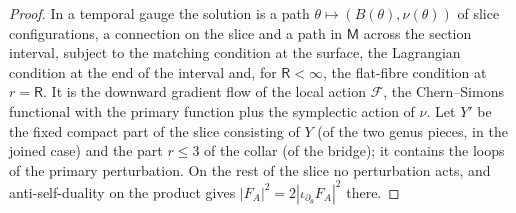 \documentclass[11pt]{amsart}
\theoremstyle{definition}
\theoremstyle{remark}
\theoremstyle{plain}
\numberwithin{equation}{section}
\newcommand{\Msf}{\mathsf{M}}
\begin{document}
\begin{proof}
In a temporal gauge the solution is a path $\theta\mapsto(B(\theta),\nu(\theta))$ of slice
configurations, a connection on the slice and a path in $\Msf$ across the section interval,
subject to the matching condition at the surface, the Lagrangian condition at the end of
the interval and, for $\mathsf R<\infty$, the flat-fibre condition at $r=\mathsf R$. It is the downward
gradient flow of the local action $\mathcal F$, the Chern--Simons functional with the primary
function plus the symplectic action of $\nu$. Let $Y'$ be the fixed compact part of the slice
consisting of $Y$ (of the two genus pieces, in the joined case) and the part $r\le3$ of the
collar (of the bridge); it contains the loops of the primary perturbation. On the rest of
the slice no perturbation acts, and anti-self-duality on the product gives
$|F_A|^2=2|\iota_{\partial_\theta}F_A|^2$ there.


\end{proof}
\end{document}
